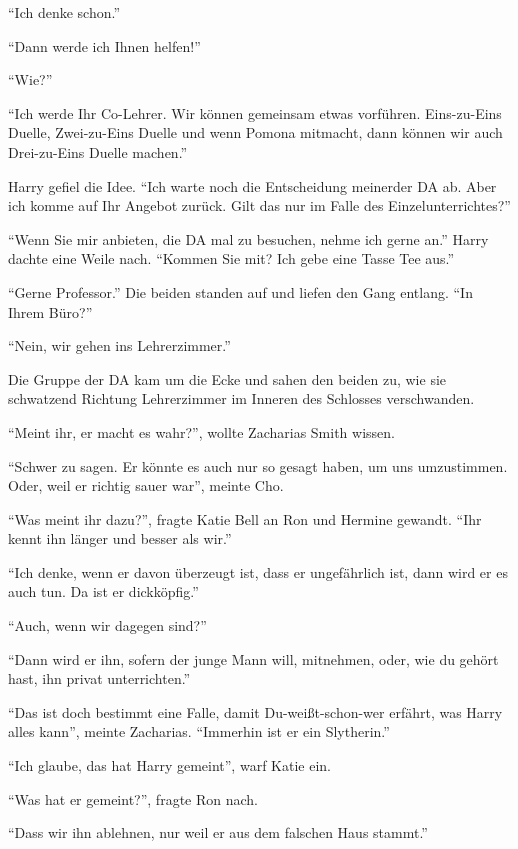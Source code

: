 \enquote{Ich denke schon.}

\enquote{Dann werde ich Ihnen helfen!}

\enquote{Wie?}

\enquote{Ich werde Ihr Co-Lehrer. Wir können gemeinsam etwas vorführen. Eins-zu-Eins Duelle, Zwei-zu-Eins Duelle und wenn Pomona mitmacht, dann können wir auch Drei-zu-Eins Duelle machen.}

Harry gefiel die Idee. \enquote{Ich warte noch die Entscheidung meiner\abs der DA ab. Aber ich komme auf Ihr Angebot zurück. Gilt das nur im Falle des Einzelunterrichtes?}

\enquote{Wenn Sie mir anbieten, die DA mal zu besuchen, nehme ich gerne an.} Harry dachte eine Weile nach. \enquote{Kommen Sie mit? Ich gebe eine Tasse Tee aus.}

\enquote{Gerne Professor.} Die beiden standen auf und liefen den Gang entlang. \enquote{In Ihrem Büro?}

\enquote{Nein, wir gehen ins Lehrerzimmer.}

Die Gruppe der DA kam um die Ecke und sahen den beiden zu, wie sie schwatzend Richtung Lehrerzimmer im Inneren des Schlosses verschwanden.

\enquote{Meint ihr, er macht es wahr?}, wollte Zacharias Smith wissen.

\enquote{Schwer zu sagen. Er könnte es auch nur so gesagt haben, um uns umzustimmen. Oder, weil er richtig sauer war}, meinte Cho.

\enquote{Was meint ihr dazu?}, fragte Katie Bell an Ron und Hermine gewandt. \enquote{Ihr kennt ihn länger und besser als wir.}

\enquote{Ich denke, wenn er davon überzeugt ist, dass er ungefährlich ist, dann wird er es auch tun. Da ist er dickköpfig.}

\enquote{Auch, wenn wir dagegen sind?}

\enquote{Dann wird er ihn, sofern der junge Mann will, mitnehmen, oder, wie du gehört hast, ihn privat unterrichten.}

\enquote{Das ist doch bestimmt eine Falle, damit Du-weißt-schon-wer erfährt, was Harry alles kann}, meinte Zacharias. \enquote{Immerhin ist er ein Slytherin.}

\enquote{Ich glaube, das hat Harry gemeint}, warf Katie ein.

\enquote{Was hat er gemeint?}, fragte Ron nach.

\enquote{Dass wir ihn ablehnen, nur weil er aus dem falschen Haus stammt.}

